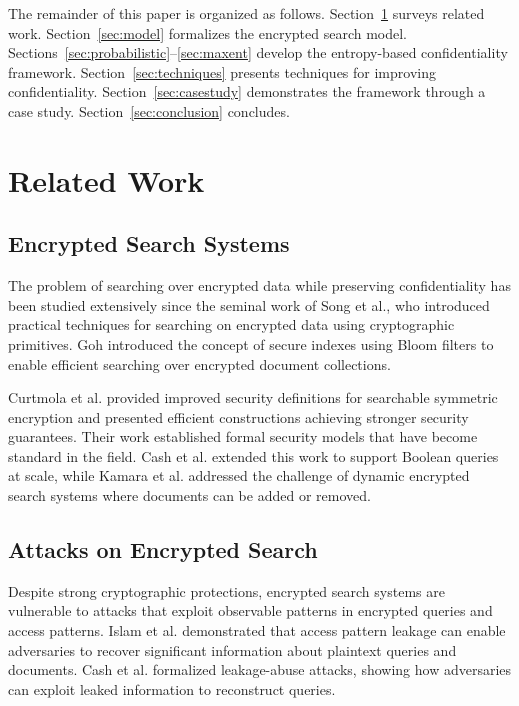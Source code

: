 \documentclass[final,11pt]{article}
\numberwithin{equation}{section}
\theoremstyle{plain}
\theoremstyle{remark}
\begin{document}
The remainder of this paper is organized as follows. Section~\ref{sec:related} surveys related work. Section~\ref{sec:model} formalizes the encrypted search model. Sections~\ref{sec:probabilistic}--\ref{sec:maxent} develop the entropy-based confidentiality framework. Section~\ref{sec:techniques} presents techniques for improving confidentiality. Section~\ref{sec:casestudy} demonstrates the framework through a case study. Section~\ref{sec:conclusion} concludes.
\section{Related Work}
\label{sec:related}

\subsection{Encrypted Search Systems}
The problem of searching over encrypted data while preserving confidentiality has been studied extensively since the seminal work of Song et al.\cite{song2000practical}, who introduced practical techniques for searching on encrypted data using cryptographic primitives. Goh\cite{goh2003secure} introduced the concept of secure indexes using Bloom filters to enable efficient searching over encrypted document collections.

Curtmola et al.\cite{curtmola2006searchable} provided improved security definitions for searchable symmetric encryption and presented efficient constructions achieving stronger security guarantees. Their work established formal security models that have become standard in the field. Cash et al.\cite{cash2013highly} extended this work to support Boolean queries at scale, while Kamara et al.\cite{kamara2012dynamic} addressed the challenge of dynamic encrypted search systems where documents can be added or removed.

\subsection{Attacks on Encrypted Search}
Despite strong cryptographic protections, encrypted search systems are vulnerable to attacks that exploit observable patterns in encrypted queries and access patterns. Islam et al.\cite{islam2012access} demonstrated that access pattern leakage can enable adversaries to recover significant information about plaintext queries and documents. Cash et al.\cite{cash2015leakage} formalized leakage-abuse attacks, showing how adversaries can exploit leaked information to reconstruct queries.
\end{document}
